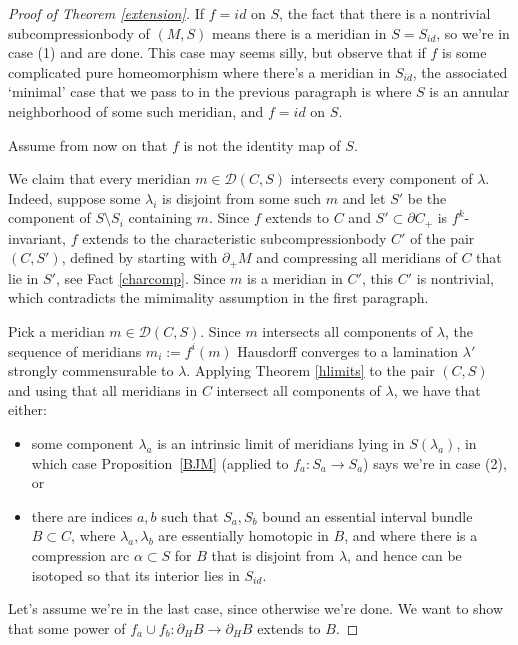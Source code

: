 \documentclass[12pt]{amsart}
\theoremstyle{definition}
\theoremstyle{remark}
\begin{document}
\begin{proof}[Proof of Theorem \ref{extension}]
If $f=id $ on $S$, the fact that there is a nontrivial subcompressionbody of $(M,S)$ means there is a meridian in $S=S_{id}$, so we're in case (1) and are done. This case may seems silly, but observe that if $f$ is some complicated pure homeomorphism where there's a meridian in $S_{id}$, the associated `minimal' case that we pass to in the previous paragraph is where $S$ is an annular neighborhood of some such meridian, and $f=id $ on $S$. 

\smallskip

Assume from now on that $f$ is not the identity map of $S$.

\smallskip


We claim that every meridian $m\in \mathcal D(C,S)$ intersects every component of $\lambda$. Indeed, suppose some $\lambda_i$ is disjoint from some such $m$ and let $S'$ be the component of $S \setminus S_i$ containing $m$. Since $f$ extends to $C$ and $S' \subset \partial C_+$ is $f^k$-invariant, $f$ extends to the characteristic subcompressionbody $C'$ of the pair $(C,S')$, defined by starting with $\partial_+ M$ and compressing all meridians of $C$ that lie in $S'$, see Fact \ref{charcomp}. Since $m$ is a meridian in $C'$, this $C'$ is nontrivial, which contradicts the mimimality assumption in the first paragraph.


Pick a meridian $m\in \mathcal D(C,S)$. Since $m$ intersects all components of $\lambda$,  the sequence of meridians $m_i:=f^{i}(m)$ Hausdorff converges to a lamination $\lambda'$ strongly commensurable to $\lambda$. Applying Theorem \ref{hlimits} to the pair $(C,S)$ and using that all meridians in $C$ intersect all components of $\lambda$, we have that either:
\begin{itemize}
\item some component $\lambda_a$ is an intrinsic limit of meridians {lying in $S(\lambda_a)$}, in which case Proposition~\ref{BJM} (applied to $f_a : S_a \longrightarrow S_a$) says we're in case (2), or 
\item there are indices $a,b$ such that $S_a,S_b$ bound an essential interval bundle $B \subset C$, where $\lambda_a,\lambda_b$ are essentially homotopic in $B$, and where there is a compression arc $\alpha \subset S$ for $B$ that is disjoint from $\lambda$, and hence can be isotoped so that its interior lies in $S_{id}$.
\end{itemize} 
Let's assume we're in the last case, since otherwise we're done. We want to show that some power of  $f_a \cup f_b : \partial_H B \longrightarrow \partial_HB$ extends to $B$.


\end{proof}
\end{document}
